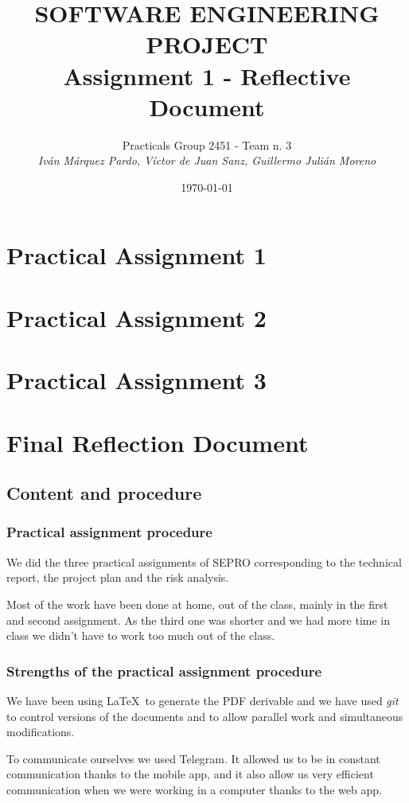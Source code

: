 \documentclass{report}
\title{SOFTWARE ENGINEERING PROJECT\\Assignment 1 - Reflective Document}
\date{\today}
\author{Practicals Group 2451 - Team n. 3 \\ \vspace{5pt} \textit{Iván Márquez Pardo, Víctor de Juan Sanz, Guillermo Julián Moreno}}
\begin{document}
\maketitle
\pagestyle{plain}
\chapter{Practical Assignment 1}

\chapter{Practical Assignment 2}

\chapter{Practical Assignment 3}



\chapter{Final Reflection Document}

\section{Content and procedure}

\subsection{Practical assignment procedure}

We did the three practical assignments of SEPRO corresponding to the technical report, the project plan and the risk analysis.

Most of the work have been done at home, out of the class, mainly in the first and second assignment. As the third one was shorter and we had more time in class we didn't have to work too much out of the class.

\subsection{Strengths of the practical assignment procedure}

We have been using \LaTeX\ to generate the PDF derivable and we have used \textit{git} to control versions of the documents and to allow parallel work and simultaneous modifications.

To communicate ourselves we used Telegram. It allowed us to be in constant communication thanks to the mobile app, and it also allow us very efficient communication when we were working in a computer thanks to the web app.
\end{document}
